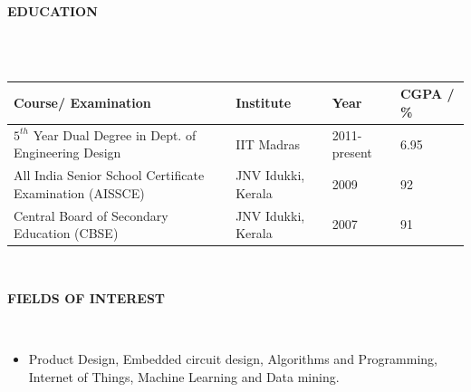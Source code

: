 \documentclass[a4paper,10pt]{article}
\newcommand{\lsep}{-0.5cm}
\newcommand{\resheading}[1]{{\small \colorbox{mygrey}{\begin{minipage}{0.975\textwidth}{\textbf{#1 \vphantom{p\^{E}}}}\end{minipage}}}}
\begin{document}
\resheading{\textbf{EDUCATION} }\\[\lsep]
    \\

    \indent \begin{tabularx}{0.97\textwidth}{ X  p{3.4cm}  p{2.3cm} p{2cm} }
    \hline
    \textbf{Course/ Examination} & \textbf{Institute} & \textbf{Year} & \textbf{CGPA / \%} \\
    \hline
    $5^{th}$ Year Dual Degree in Dept. of Engineering Design & IIT Madras & 2011-present & 6.95\\
    All India Senior School Certificate Examination (AISSCE) & JNV Idukki, Kerala & 2009 & 92\\
    Central Board of Secondary Education (CBSE) & JNV Idukki, Kerala & 2007 & 91\\
    \hline
    \end{tabularx}
    \\


\resheading{\textbf{FIELDS OF INTEREST} }\\[\lsep]
    \begin{itemize}
        \item \noindent Product Design, Embedded circuit design, Algorithms and Programming, Internet of Things, Machine Learning and Data mining.
    \end{itemize}
\end{document}
